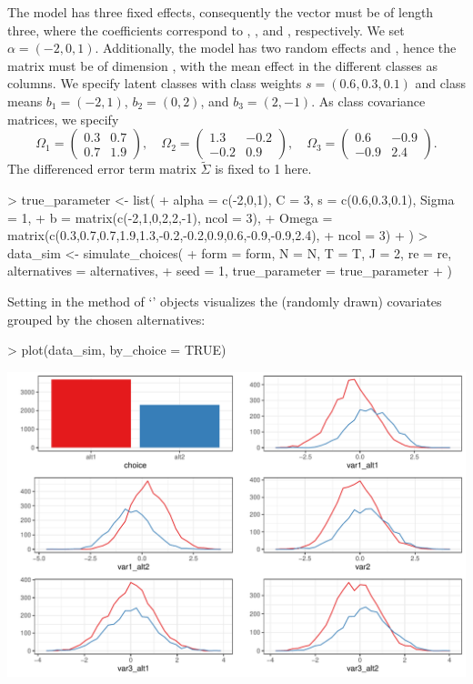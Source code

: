 \documentclass[article,shortnames]{jss}
\newcommand{\class}[1]{`\code{#1}'}
\newcommand{\fct}[1]{\code{#1()}}
\begin{document}
The model has three fixed effects, consequently the vector  must be of length three, where the coefficients correspond to , , and , respectively. We set $\alpha = (-2,0,1)$. Additionally, the model has two random effects  and , hence the matrix  must be of dimension , with the mean effect in the different classes as columns. We specify  latent classes with class weights $s = (0.6,0.3,0.1)$ and class means $b_1 = (-2,1)$, $b_2 = (0,2)$, and $b_3 = (2,-1)$. As class covariance matrices, we specify
$$\Omega_1 = \begin{pmatrix} 0.3 & 0.7 \\ 0.7 & 1.9 \end{pmatrix}, \quad \Omega_2 = \begin{pmatrix} 1.3 & -0.2 \\ -0.2 & 0.9 \end{pmatrix}, \quad \Omega_3 = \begin{pmatrix} 0.6 & -0.9 \\ -0.9 & 2.4 \end{pmatrix}.$$
The differenced error term matrix $\tilde{\Sigma}$ is fixed to 1 here.

\begin{Schunk}
\begin{Sinput}
> true_parameter <- list(
+    alpha = c(-2,0,1), C = 3, s = c(0.6,0.3,0.1), Sigma = 1,
+    b = matrix(c(-2,1,0,2,2,-1), ncol = 3),
+    Omega = matrix(c(0.3,0.7,0.7,1.9,1.3,-0.2,-0.2,0.9,0.6,-0.9,-0.9,2.4),
+                   ncol = 3)
+  )
> data_sim <- simulate_choices(
+    form = form, N = N, T = T, J = 2, re = re, alternatives = alternatives,
+    seed = 1, true_parameter = true_parameter
+  )
\end{Sinput}
\end{Schunk}

Setting  in the \fct{plot} method of \class{RprobitB\_data} objects visualizes the (randomly drawn) covariates grouped by the chosen alternatives:

\begin{Schunk}
\begin{Sinput}
> plot(data_sim, by_choice = TRUE)
\end{Sinput}
\end{Schunk}
\includegraphics{rprobitb_oelschlaeger_bauer-sim-data}
\end{document}
